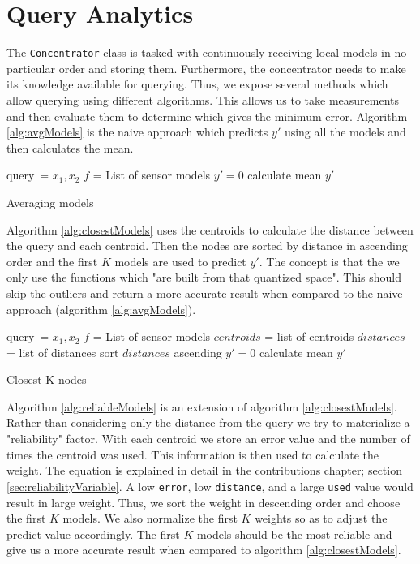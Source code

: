 \documentclass{mproj}
\begin{document}
\section{Query Analytics}
\label{sec:queryAnalytics}
The \texttt{Concentrator} class is tasked with continuously receiving local models in no particular order and storing them. Furthermore, the concentrator needs to make its knowledge available for querying. Thus, we expose several methods which allow querying using different algorithms. This allows us to take measurements and then evaluate them to determine which gives the minimum error. Algorithm \ref{alg:avgModels} is the naive approach which predicts $y'$ using all the models and then calculates the mean.

\begin{algorithm}[H]
 query\ = $x_1,x_2$\; 
 $f$ = List of sensor models\;
 $y'=0$\;
 calculate mean $y'$
 \caption{Averaging models}
 \label{alg:avgModels}
\end{algorithm}

Algorithm \ref{alg:closestModels} uses the centroids to calculate the distance between the query and each centroid. Then the nodes are sorted by distance in ascending order and the first $K$ models are used to predict $y'$. The concept is that the we only use the functions which "are built from that quantized space". This should skip the outliers and return a more accurate result when compared to the naive approach (algorithm \ref{alg:avgModels}).

\begin{algorithm}[H]
 query\ = $x_1,x_2$\;
 $f$ = List of sensor models\;
 $centroids$ = list of centroids\;
 $distances$ = list of distances\;
 sort $distances$ ascending\;
 $y'=0$\;
 calculate mean $y'$\;
 \caption{Closest K nodes}
 \label{alg:closestModels}
\end{algorithm}

Algorithm \ref{alg:reliableModels} is an extension of algorithm \ref{alg:closestModels}. Rather than considering only the distance from the query we try to materialize a "reliability" factor. With each centroid we store an error value and the number of times the centroid was used. This information is then used to calculate the weight. The equation is explained in detail in the contributions chapter; section \ref{sec:reliabilityVariable}. A low \texttt{error}, low \texttt{distance}, and a large \texttt{used} value would  result in large weight. Thus, we sort the weight in descending order and choose the first $K$ models. We also normalize the first $K$ weights so as to adjust the predict value accordingly. The first $K$ models should be the most reliable and give us a more accurate result when compared to algorithm \ref{alg:closestModels}.
\end{document}
